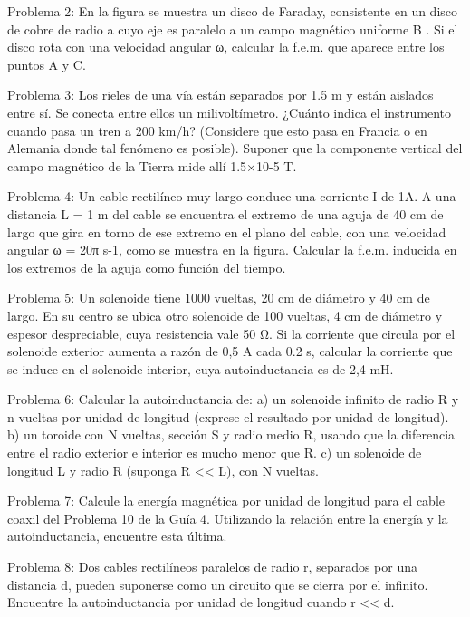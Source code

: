 Problema 2:
En la figura se muestra un disco de Faraday, consistente en un disco de cobre de radio a cuyo eje es paralelo a un campo magnético uniforme B .
Si  el  disco  rota  con  una  velocidad  angular  ω,  calcular  la  f.e.m.  que
aparece entre los puntos A y C.



Problema 3:
Los rieles de una vía están separados por 1.5 m y están aislados entre sí. Se conecta entre ellos un milivoltímetro. ¿Cuánto indica el instrumento cuando pasa un tren a 200 km/h? (Considere que esto pasa en Francia o en Alemania donde tal fenómeno es posible). Suponer que la componente vertical del campo magnético de la Tierra mide allí  1.5×10-5 T.



Problema 4:
Un cable rectilíneo muy largo conduce una corriente I de 1A. A una distancia L = 1 m del cable se encuentra el extremo de una aguja de 40 cm de largo que gira en torno de ese extremo en el plano del cable, con una velocidad angular ω = 20π s-1, como se muestra en la figura. Calcular la f.e.m. inducida en los extremos de la aguja como función del tiempo.



Problema 5:
Un solenoide tiene 1000 vueltas, 20 cm de diámetro y 40 cm de largo. En su centro se ubica otro solenoide de 100 vueltas, 4 cm de diámetro y espesor despreciable, cuya resistencia vale 50 Ω. Si la corriente que circula por el solenoide exterior aumenta a razón de 0,5 A cada 0.2 s, calcular la corriente que se induce en el solenoide interior, cuya autoinductancia es de 2,4 mH.

Problema 6:
Calcular la autoinductancia de:
a)	un solenoide infinito de radio R y n vueltas por unidad de longitud (exprese el resultado por unidad de longitud).
b)	un toroide con N vueltas, sección S y radio medio R, usando que la diferencia entre el radio exterior e interior es mucho menor que R.
c)	un solenoide de longitud L y radio R (suponga R << L), con N vueltas.
 



Problema 7:
Calcule la energía magnética por unidad de longitud para el cable coaxil del Problema 10 de la Guía 4. Utilizando la relación entre la energía y la autoinductancia, encuentre esta última.

Problema 8:
Dos cables rectilíneos paralelos de radio r, separados por una distancia d, pueden suponerse como un circuito que se cierra por el infinito. Encuentre la autoinductancia por unidad de longitud cuando r << d.



